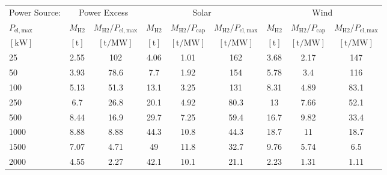 \begin{table}
\label{tab: VaryElectrolyser}
\begin{tabular}{l|cc|ccc|ccc}
\toprule
Power Source: & \multicolumn{2}{|c}{Power Excess} & \multicolumn{3}{|c}{Solar} & \multicolumn{3}{|c}{Wind} \\
$P_{\mathrm{el,max}}$ & $M_{\mathrm{H2}}$ & $M_{\mathrm{H2}}/P_{\mathrm{el,max}}$ & $M_{\mathrm{H2}}$ & $M_{\mathrm{H2}}/P_{\mathrm{cap}}$ & $M_{\mathrm{H2}}/P_{\mathrm{el,max}}$ & $M_{\mathrm{H2}}$ & $M_{\mathrm{H2}}/P_{\mathrm{cap}}$ & $M_{\mathrm{H2}}/P_{\mathrm{el,max}}$ \\
$\left[\mathrm{kW}\right]$ & $\left[\mathrm{t}\right]$ & $\left[\mathrm{t/MW}\right]$ & $\left[\mathrm{t}\right]$ & $\left[\mathrm{t/MW}\right]$ & $\left[\mathrm{t/MW}\right]$ & $\left[\mathrm{t}\right]$ & $\left[\mathrm{t/MW}\right]$ & $\left[\mathrm{t/MW}\right]$ \\
\midrule
25 & 2.55 & 102 & 4.06 & 1.01 & 162 & 3.68 & 2.17 & 147 \\
50 & 3.93 & 78.6 & 7.7 & 1.92 & 154 & 5.78 & 3.4 & 116 \\
100 & 5.13 & 51.3 & 13.1 & 3.25 & 131 & 8.31 & 4.89 & 83.1 \\
250 & 6.7 & 26.8 & 20.1 & 4.92 & 80.3 & 13 & 7.66 & 52.1 \\
500 & 8.44 & 16.9 & 29.7 & 7.25 & 59.4 & 16.7 & 9.82 & 33.4 \\
1000 & 8.88 & 8.88 & 44.3 & 10.8 & 44.3 & 18.7 & 11 & 18.7 \\
1500 & 7.07 & 4.71 & 49 & 11.8 & 32.7 & 9.76 & 5.74 & 6.5 \\
2000 & 4.55 & 2.27 & 42.1 & 10.1 & 21.1 & 2.23 & 1.31 & 1.11 \\
\bottomrule
\end{tabular}
\end{table}
